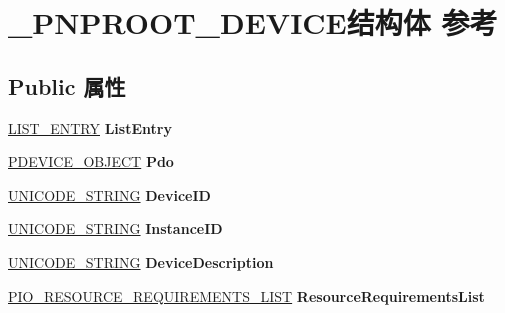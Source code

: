 \hypertarget{struct___p_n_p_r_o_o_t___d_e_v_i_c_e}{}\section{\+\_\+\+P\+N\+P\+R\+O\+O\+T\+\_\+\+D\+E\+V\+I\+C\+E结构体 参考}
\label{struct___p_n_p_r_o_o_t___d_e_v_i_c_e}
\subsection*{Public 属性}
\begin{DoxyCompactItemize}
\item 
\mbox{\label{struct___p_n_p_r_o_o_t___d_e_v_i_c_e_a9c8f8fbd129b8ed158dbcaca014d732e}} 
\hyperlink{struct___l_i_s_t___e_n_t_r_y}{L\+I\+S\+T\+\_\+\+E\+N\+T\+RY} {\bfseries List\+Entry}
\item 
\mbox{\label{struct___p_n_p_r_o_o_t___d_e_v_i_c_e_a9bdd1533174d2b12125ef10cb953de0e}} 
\hyperlink{struct___d_e_v_i_c_e___o_b_j_e_c_t}{P\+D\+E\+V\+I\+C\+E\+\_\+\+O\+B\+J\+E\+CT} {\bfseries Pdo}
\item 
\mbox{\label{struct___p_n_p_r_o_o_t___d_e_v_i_c_e_a3ddcbebb32f304c0c77f9a3751efa700}} 
\hyperlink{struct___u_n_i_c_o_d_e___s_t_r_i_n_g}{U\+N\+I\+C\+O\+D\+E\+\_\+\+S\+T\+R\+I\+NG} {\bfseries Device\+ID}
\item 
\mbox{\label{struct___p_n_p_r_o_o_t___d_e_v_i_c_e_a68ef0540c1ffb3fbdfc9a05c965e6b1a}} 
\hyperlink{struct___u_n_i_c_o_d_e___s_t_r_i_n_g}{U\+N\+I\+C\+O\+D\+E\+\_\+\+S\+T\+R\+I\+NG} {\bfseries Instance\+ID}
\item 
\mbox{\label{struct___p_n_p_r_o_o_t___d_e_v_i_c_e_ad1c4bc4eda31cb3caeed3ea564cb23fd}} 
\hyperlink{struct___u_n_i_c_o_d_e___s_t_r_i_n_g}{U\+N\+I\+C\+O\+D\+E\+\_\+\+S\+T\+R\+I\+NG} {\bfseries Device\+Description}
\item 
\mbox{\label{struct___p_n_p_r_o_o_t___d_e_v_i_c_e_a1abf14c12542cc6eb5efc386088284fd}} 
\hyperlink{struct___i_o___r_e_s_o_u_r_c_e___r_e_q_u_i_r_e_m_e_n_t_s___l_i_s_t}{P\+I\+O\+\_\+\+R\+E\+S\+O\+U\+R\+C\+E\+\_\+\+R\+E\+Q\+U\+I\+R\+E\+M\+E\+N\+T\+S\+\_\+\+L\+I\+ST} {\bfseries Resource\+Requirements\+List}

\end{DoxyCompactItemize}

